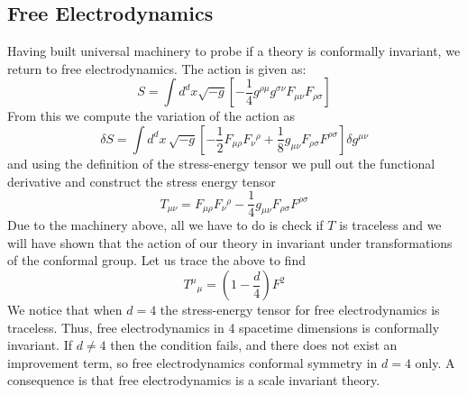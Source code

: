 \documentclass{article}
\begin{document}
\subsection{Free Electrodynamics}
Having built universal machinery to probe if a theory is conformally invariant, we return to free electrodynamics. The action is given as: 
\begin{equation}
    S = \int d^dx\sqrt{-g}\left[-\frac{1}{4} g^{\rho\mu}g^{\sigma\nu}F_{\mu\nu}F_{\rho\sigma}\right]
\end{equation}
From this we compute the variation of the action as 
\begin{equation}
\delta S
=
\int d^d x \,\sqrt{-g}
\left[
-\frac{1}{2} F_{\mu\rho}F_{\nu}{}^{\rho}
+\frac{1}{8} g_{\mu\nu} F_{\rho\sigma}F^{\rho\sigma}
\right]\delta g^{\mu\nu}
\end{equation}
and using the definition of the stress-energy tensor we pull out the functional derivative and construct the stress energy tensor
\begin{equation}
T_{\mu\nu}
=
F_{\mu\rho}F_{\nu}{}^{\rho}
-
\frac{1}{4}g_{\mu\nu}F_{\rho\sigma}F^{\rho\sigma}
\end{equation}
Due to the machinery above, all we have to do is check if $T$ is traceless and we will have shown that the action of our theory in invariant under transformations of the conformal group. Let us trace the above to find
\begin{equation}
    T^\mu{}_\mu = \left(1-\frac{d}{4}\right)F^2
\end{equation}
We notice that when $d = 4$ the stress-energy tensor for free electrodynamics is traceless. Thus, free electrodynamics in 4 spacetime dimensions is conformally invariant. If $d\neq 4$ then the condition fails, and there does not exist an improvement term, so free electrodynamics conformal symmetry in $d=4$ only. A consequence is that free electrodynamics is a scale invariant theory. 
\end{document}

